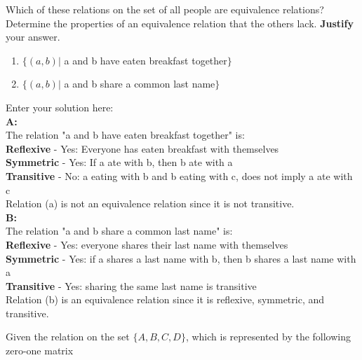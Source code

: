\documentclass[10pt]{exam}
\begin{document}
\begin{questions}
\question[6] Which of these relations on the set of all people are equivalence relations? Determine the properties of an equivalence relation that the others lack. \textbf{Justify} your answer.

\begin{enumerate}
 \item[(a)] $\{(a, b) |$ a and b have eaten breakfast together$\}$
 \item[(b)] $\{(a, b) |$ a and b share a common last name$\}$
\end{enumerate}

\begin{solution}
    Enter your solution here:\\
    \textbf{A:}\\
    The relation "a and b have eaten breakfast together" is:\\
    \textbf{Reflexive} - Yes: Everyone has eaten breakfast with themselves\\
    \textbf{Symmetric} - Yes: If a ate with b, then b ate with a\\
    \textbf{Transitive} - No: a eating with b and b eating with c, does not imply a ate with c\\
    Relation (a) is not an equivalence relation since it is not transitive.\\
    
    \textbf{B:}\\
    The relation "a and b share a common last name" is:\\
    \textbf{Reflexive} - Yes: everyone shares their last name with themselves\\
    \textbf{Symmetric} - Yes: if a shares a last name with b, then b shares a last name with a\\
    \textbf{Transitive} - Yes: sharing the same last name is transitive\\
    Relation (b) is an equivalence relation since it is reflexive, symmetric, and transitive.\\
\end{solution}

\question[10] Given the relation on the set $\{A, B, C, D\}$, which is represented by the following zero-one matrix


\end{questions}
\end{document}
